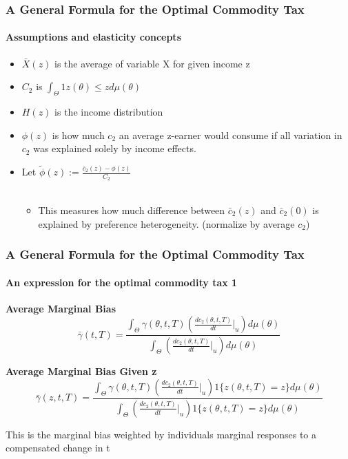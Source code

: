 \documentclass{beamer}
\begin{document}
\begin{frame}
\frametitle{A General Formula for the Optimal Commodity Tax}
\framesubtitle{Assumptions and elasticity concepts}


\begin{itemize}
	\item $\bar{X}(z)$ is the average of variable X for given income z 
	\item $C_2$ is $\int_{\Theta}^{}1{z(\theta ) \leq z}d\mu(\theta)$
	\item 	$H(z)$ is the income distribution 
	\item $\phi(z)$ is how much $c_2$ an average z-earner would consume if all variation in $c_2$ was explained solely by income effects. 
	\item Let $\tilde{\phi}(z) := \frac{\bar{c}_2(z) - \phi(z)}{C_2}$ \\~\\ 
	
	\begin{itemize}
		\item This measures how much difference between $\bar{c}_2(z)$ and $\bar{c}_2(0)$ is explained by preference heterogeneity. (normalize by average $c_2$)
	\end{itemize}
	
\end{itemize}

\end{frame}



\begin{frame}
\frametitle{A General Formula for the Optimal Commodity Tax}
\framesubtitle{An expression for the optimal commodity tax 1}

\textbf{Average Marginal Bias}
$$ \bar{\gamma}(t,T) = \frac{\int_{\Theta}\gamma(\theta,t,T) \left( \frac{dc_2(\theta,t,T)}{dt}  \biggr\rvert_{u} \right)d\mu(\theta)}{\int_{\Theta}\left( \frac{dc_2(\theta,t,T)}{dt}  \biggr\rvert_{u} \right)d\mu(\theta)}$$

\textbf{Average Marginal Bias Given z}
$$ \bar{\gamma}(z,t,T) = \frac{\int_{\Theta}\gamma(\theta,t,T) \left( \frac{dc_2(\theta,t,T)}{dt}  \biggr\rvert_{u} \right) 1 \{ z(\theta,t,T) = z \} d \mu(\theta)  }    {\int_{\Theta}\left( \frac{dc_2(\theta,t,T)}{dt}  \biggr\rvert_{u} \right) 1 \{ z(\theta,t,T) = z \} d\mu(\theta)}$$


This is the marginal bias weighted by individuals marginal responses to a compensated change in t


\end{frame}
\end{document}
